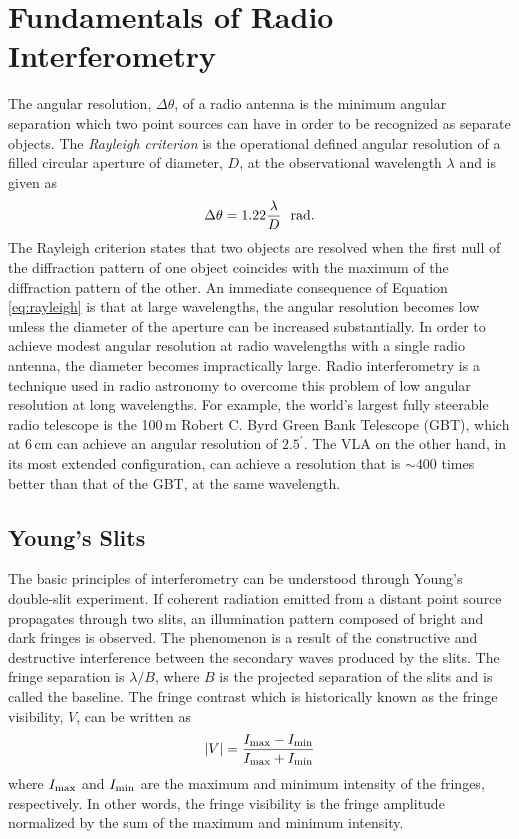 \section{Fundamentals of Radio Interferometry}\label{sec:3}
The angular resolution, $\Delta \theta$, of a radio antenna is the minimum angular separation which two point sources can have in order to be recognized as separate objects. The \textit{Rayleigh criterion} is the operational defined  angular resolution of a filled circular aperture of diameter, $D$, at the observational wavelength $\lambda$ and is given as
\begin{equation}
\Delta \theta=1.22\frac{\lambda}{D} \ \ \rm{rad}.
\label{eq:rayleigh}
\end{equation}
The Rayleigh criterion states that two objects are resolved when the first null of the diffraction pattern of one object coincides with the maximum of the diffraction pattern of the other. An immediate consequence of Equation \ref{eq:rayleigh} is that at large wavelengths, the angular resolution becomes low unless the diameter of the aperture can be increased substantially. In order to achieve modest angular resolution at radio wavelengths with a single radio antenna, the diameter becomes impractically large. Radio interferometry is a technique used in radio astronomy to overcome this problem of low angular resolution at long wavelengths. For example, the world's largest fully steerable radio telescope is the 100\,m  Robert C. Byrd Green Bank Telescope (GBT), which at 6\,cm can achieve an angular resolution of $2.5^{\prime}$. The VLA on the other hand, in its most extended configuration, can achieve a resolution that is $\sim 400$ times better than that of the GBT, at the same wavelength.



\subsection{Young's Slits}\label{subsec:4}
The basic principles of interferometry can be understood through Young's double-slit experiment. If coherent radiation emitted from a distant point source propagates through two slits, an illumination pattern composed of bright and dark fringes is observed. The phenomenon is a result of the constructive and destructive interference between the secondary waves produced by the slits. The fringe separation is $\lambda /B$, where $B$ is the projected separation of the slits and is called the baseline. The fringe contrast which is historically known as the fringe visibility, $V$, can be written as
\begin{equation}
|V| = \frac{I_{\rm{max}}-I_{\rm{min}}}{I_{\rm{max}} + I_{\rm{min}}}
\end{equation}
where $I_{\rm{max}}$ and $I_{\rm{min}}$ are the maximum and minimum intensity of the fringes, respectively. In other words, the fringe visibility is the fringe amplitude normalized by the sum of the maximum and minimum intensity. 

